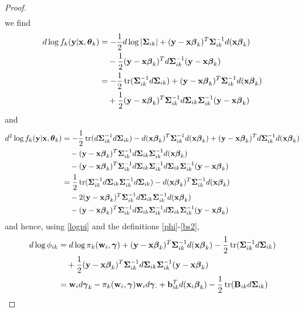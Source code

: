 \begin{proof}
\begin{align*}
\end{align*}
we find 
\begin{align*}
d\log f_{k}(\mathbf y|\mathbf x,\boldsymbol\theta_{k})&=-\frac{1}{2}d\log|\boldsymbol\Sigma_{ik}|+(\mathbf y-\mathbf x\boldsymbol \beta_{k})^{T}\boldsymbol\Sigma_{ik}^{-1}d(\mathbf x\boldsymbol \beta_{k})\\
&\quad-\frac{1}{2}(\mathbf y-\mathbf x\boldsymbol \beta_{k})^{T}d\boldsymbol\Sigma_{ik}^{-1}(\mathbf y-\mathbf x\boldsymbol\beta_{k})\\
&=-\frac{1}{2}\operatorname{tr}(\boldsymbol\Sigma_{ik}^{-1}d\boldsymbol\Sigma_{ik})+(\mathbf y-\mathbf x\boldsymbol \beta_{k})^{T}\boldsymbol\Sigma_{ik}^{-1}d(\mathbf x\boldsymbol \beta_{k})\\
&\quad+\frac{1}{2}(\mathbf y-\mathbf x\boldsymbol \beta_{k})^{T}\boldsymbol\Sigma_{ik}^{-1}d\boldsymbol\Sigma_{ik}\boldsymbol\Sigma_{ik}^{-1}(\mathbf y-\mathbf x\boldsymbol\beta_{k})\\
\end{align*}
and
\begin{align*}
d^{2}\log f_{k}(\mathbf y|\mathbf x,\boldsymbol\theta_{k})&=-\frac{1}{2}\operatorname{tr}(d\boldsymbol\Sigma_{ik}^{-1}d\boldsymbol\Sigma_{ik})-d(\mathbf x\boldsymbol \beta_{k})^{T}\boldsymbol\Sigma_{ik}^{-1}d(\mathbf x\boldsymbol \beta_{k})+(\mathbf y-\mathbf x\boldsymbol \beta_{k})^{T}d\boldsymbol\Sigma_{ik}^{-1}d(\mathbf x\boldsymbol \beta_{k})\\
&\quad-(\mathbf y-\mathbf x\boldsymbol \beta_{k})^{T}\boldsymbol\Sigma_{ik}^{-1}d\boldsymbol\Sigma_{ik}\boldsymbol\Sigma_{ik}^{-1}d(\mathbf x\boldsymbol\beta_{k})\\
&\quad-(\mathbf y-\mathbf x\boldsymbol \beta_{k})^{T}\boldsymbol\Sigma_{ik}^{-1}d\boldsymbol\Sigma_{ik}\boldsymbol\Sigma_{ik}^{-1}d\boldsymbol\Sigma_{ik}\boldsymbol\Sigma_{ik}^{-1}(\mathbf y-\mathbf x\boldsymbol\beta_{k})\\
&=\frac{1}{2}\operatorname{tr}(\boldsymbol\Sigma_{ik}^{-1}d\boldsymbol\Sigma_{ik}\boldsymbol\Sigma_{ik}^{-1}d\boldsymbol\Sigma_{ik})-d(\mathbf x\boldsymbol \beta_{k})^{T}\boldsymbol\Sigma_{ik}^{-1}d(\mathbf x\boldsymbol \beta_{k})\\
&\quad-2(\mathbf y-\mathbf x\boldsymbol \beta_{k})^{T}\boldsymbol\Sigma_{ik}^{-1}d\boldsymbol\Sigma_{ik}\boldsymbol\Sigma_{ik}^{-1}d(\mathbf x\boldsymbol\beta_{k})\\
&\quad-(\mathbf y-\mathbf x\boldsymbol \beta_{k})^{T}\boldsymbol\Sigma_{ik}^{-1}d\boldsymbol\Sigma_{ik}\boldsymbol\Sigma_{ik}^{-1}d\boldsymbol\Sigma_{ik}\boldsymbol\Sigma_{ik}^{-1}(\mathbf y-\mathbf x\boldsymbol\beta_{k})\\
\end{align*}
and hence, using \eqref{logpi} and the definitions \eqref{phi}-\eqref{bs2},
\begin{align*}
d\log \phi_{ik}&=d\log \pi_{k}(\B w_{i},\BS\gamma)+(\B y-\B x\BS \beta_{k})^{T}\BS\Sigma_{ik}^{-1}d(\B x\BS \beta_{k})-\frac{1}{2}\tr(\BS\Sigma_{ik}^{-1}d\BS\Sigma_{ik})\\
&\quad+\frac{1}{2}(\B y-\B x\BS \beta_{k})^{T}\BS\Sigma_{ik}^{-1}d\BS\Sigma_{ik}\BS\Sigma_{ik}^{-1}(\B y-\B x\BS\beta_{k})\\
&=\B w_{i} d\BS \gamma_{k} -\pi_{k}(\B w_{i},\BS\gamma)\B w_{i}d\BS\gamma_{\cdot}+\B b^{T}_{ik}d(\B x_{i}\BS \beta_{k})-\frac{1}{2}\tr(\B B_{ik}d\BS\Sigma_{ik})

\end{align*}
\end{proof}
